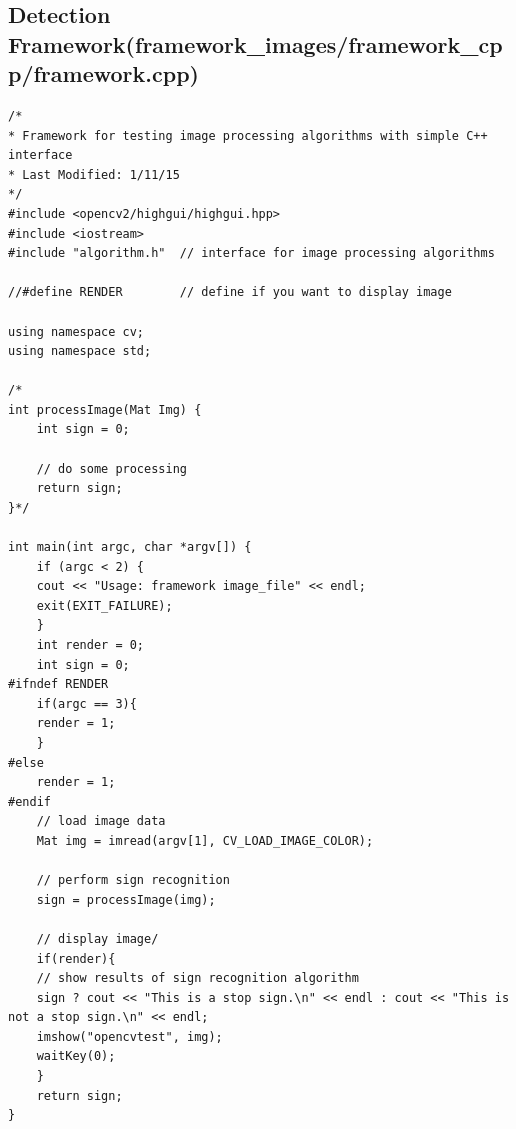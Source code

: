 \documentclass[letterpaper,10pt,titlepage]{article}
\begin{document}
\subsection*{Detection Framework(framework\_images/framework\_cpp/framework.cpp)}
\begin{lstlisting}
/*
* Framework for testing image processing algorithms with simple C++ interface
* Last Modified: 1/11/15
*/
#include <opencv2/highgui/highgui.hpp>
#include <iostream>
#include "algorithm.h"	// interface for image processing algorithms

//#define RENDER		// define if you want to display image

using namespace cv;
using namespace std;

/*
int processImage(Mat Img) {
	int sign = 0;

	// do some processing
	return sign;
}*/

int main(int argc, char *argv[]) {
    if (argc < 2) {
	cout << "Usage: framework image_file" << endl;
	exit(EXIT_FAILURE);
    }
    int render = 0;
    int sign = 0;
#ifndef RENDER
    if(argc == 3){
	render = 1;
    }
#else
    render = 1;
#endif
    // load image data  
    Mat img = imread(argv[1], CV_LOAD_IMAGE_COLOR);

    // perform sign recognition
    sign = processImage(img);
    
    // display image/
    if(render){
	// show results of sign recognition algorithm
	sign ? cout << "This is a stop sign.\n" << endl : cout << "This is not a stop sign.\n" << endl;
	imshow("opencvtest", img);
	waitKey(0);
    }
    return sign;
}

\end{lstlisting}
\end{document}

